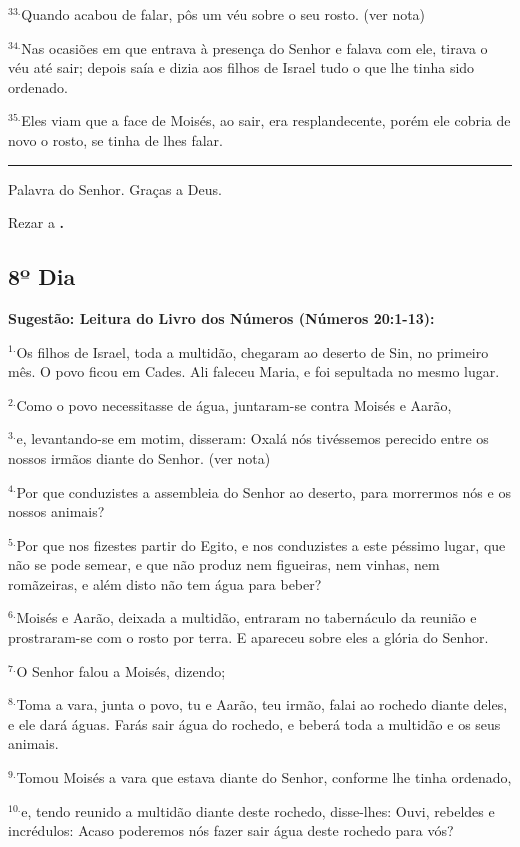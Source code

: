 \documentclass[a4paper,14pt]{extarticle} \usepackage[utf8]{inputenc}
\begin{document}
$^{33.}$Quando acabou de falar, pôs um véu sobre o seu rosto. (ver nota)

$^{34.}$Nas ocasiões em que entrava à presença do Senhor e falava com ele, tirava o véu até sair; depois saía e dizia aos filhos de Israel tudo o que lhe tinha sido ordenado.

$^{35.}$Eles viam que a face de Moisés, ao sair, era resplandecente, porém ele cobria de novo o rosto, se tinha de lhes falar.


\par\noindent\rule{\textwidth}{0.4pt}

Palavra do Senhor. Graças a Deus.

Rezar a \textbf{.}
\subsection{8º Dia}
\textbf{Sugestão: Leitura do Livro dos Números (Números 20:1-13):}

$^{1.}$Os filhos de Israel, toda a multidão, chegaram ao deserto de Sin, no primeiro mês. O povo ficou em Cades. Ali faleceu Maria, e foi sepultada no mesmo lugar.

$^{2.}$Como o povo necessitasse de água, juntaram-se contra Moisés e Aarão,

$^{3.}$e, levantando-se em motim, disseram: Oxalá nós tivéssemos perecido entre os nossos irmãos diante do Senhor. (ver nota)

$^{4.}$Por que conduzistes a assembleia do Senhor ao deserto, para morrermos nós e os nossos animais?

$^{5.}$Por que nos fizestes partir do Egito, e nos conduzistes a este péssimo lugar, que não se pode semear, e que não produz nem figueiras, nem vinhas, nem romãzeiras, e além disto não tem água para beber?

$^{6.}$Moisés e Aarão, deixada a multidão, entraram no tabernáculo da reunião e prostraram-se com o rosto por terra. E apareceu sobre eles a glória do Senhor.

$^{7.}$O Senhor falou a Moisés, dizendo;

$^{8.}$Toma a vara, junta o povo, tu e Aarão, teu irmão, falai ao rochedo diante deles, e ele dará águas. Farás sair água do rochedo, e beberá toda a multidão e os seus animais.

$^{9.}$Tomou Moisés a vara que estava diante do Senhor, conforme lhe tinha ordenado,

$^{10.}$e, tendo reunido a multidão diante deste rochedo, disse-lhes: Ouvi, rebeldes e incrédulos: Acaso poderemos nós fazer sair água deste rochedo para vós?
\end{document}
